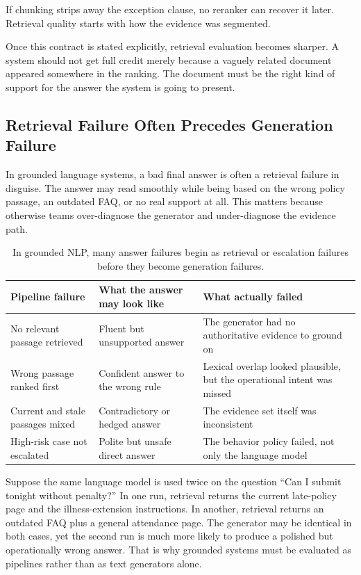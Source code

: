 \begin{practicalnote}
If chunking strips away the exception clause, no reranker can recover it later. Retrieval quality starts with how the evidence was segmented.
\end{practicalnote}

Once this contract is stated explicitly, retrieval evaluation becomes sharper. A system should not get full credit merely because a vaguely related document appeared somewhere in the ranking. The document must be the right kind of support for the answer the system is going to present.

\subsection{Retrieval Failure Often Precedes Generation Failure}

In grounded language systems, a bad final answer is often a retrieval failure in disguise. The answer may read smoothly while being based on the wrong policy passage, an outdated FAQ, or no real support at all. This matters because otherwise teams over-diagnose the generator and under-diagnose the evidence path.

\begin{table}[t]
\centering
\small
\setlength{\tabcolsep}{4pt}
\begin{tabular}{p{2.51cm}p{3.18cm}p{4.26cm}}
\toprule
Pipeline failure & What the answer may look like & What actually failed \\
\midrule
No relevant passage retrieved & Fluent but unsupported answer & The generator had no authoritative evidence to ground on \\
Wrong passage ranked first & Confident answer to the wrong rule & Lexical overlap looked plausible, but the operational intent was missed \\
Current and stale passages mixed & Contradictory or hedged answer & The evidence set itself was inconsistent \\
High-risk case not escalated & Polite but unsafe direct answer & The behavior policy failed, not only the language model \\
\bottomrule
\end{tabular}
\caption{In grounded NLP, many answer failures begin as retrieval or escalation failures before they become generation failures.}
\label{tab:nlp-retrieval-failure-modes}
\end{table}

\begin{example}
Suppose the same language model is used twice on the question ``Can I submit tonight without penalty?'' In one run, retrieval returns the current late-policy page and the illness-extension instructions. In another, retrieval returns an outdated FAQ plus a general attendance page. The generator may be identical in both cases, yet the second run is much more likely to produce a polished but operationally wrong answer. That is why grounded systems must be evaluated as pipelines rather than as text generators alone.
\end{example}

